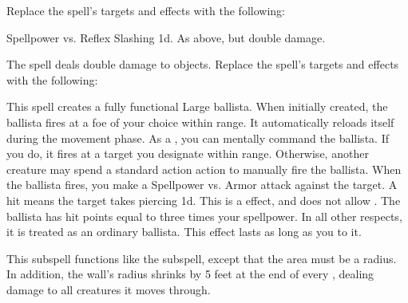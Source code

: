 Replace the spell's targets and effects with the following:
\begin{spellcontent}
\begin{augmenttargetinginfo}
\end{augmenttargetinginfo}
\begin{augmenteffects}
\begin{spellattack}{Spellpower vs. Reflex}
\spellsuccess Slashing  \minus1d.
\spellcritical As above, but double damage.
\end{spellattack}
\end{augmenteffects}
\end{spellcontent}
The spell deals double damage to objects.
Replace the spell's targets and effects with the following:
\begin{spellcontent}
\begin{augmenttargetinginfo}
\end{augmenttargetinginfo}
\begin{augmenteffects}
\spelleffect
This spell creates a fully functional Large ballista.
When initially created, the ballista fires at a foe of your choice within \rnglong range.
It automatically reloads itself during the movement phase.
As a , you can mentally command the ballista.
If you do, it fires at a target you designate within \rnglong range.
Otherwise, another creature may spend a standard action action to manually fire the ballista.
When the ballista fires, you make a Spellpower vs. Armor attack against the target.
A hit means the target takes piercing  \minus1d.
This is a  effect, and does not allow .
The ballista has hit points equal to three times your spellpower.
In all other respects, it is treated as an ordinary ballista.
This effect lasts as long as you  to it.
\end{augmenteffects}
\end{spellcontent}
This subspell functions like the  subspell, except that the area must be a radius.
In addition, the wall's radius shrinks by 5 feet at the end of every , dealing damage to all creatures it moves through.
